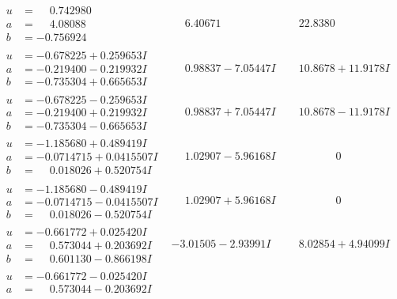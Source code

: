 \documentclass[1p]{elsarticle_modified}
\theoremstyle{definition}
\begin{document}
$$\begin{array}{c|c|c}
\begin{aligned}
u &= \phantom{-}0.742980\phantom{ +0.000000I} \\
a &= \phantom{-}4.08088\phantom{ +0.000000I} \\
b &= -0.756924\phantom{ +0.000000I}\end{aligned}
 & \phantom{-}6.40671\phantom{ +0.000000I} & \phantom{-}22.8380\phantom{ +0.000000I} \\ \hline\begin{aligned}
u &= -0.678225 + 0.259653 I \\
a &= -0.219400 - 0.219932 I \\
b &= -0.735304 + 0.665653 I\end{aligned}
 & \phantom{-}0.98837 - 7.05447 I & \phantom{-}10.8678 + 11.9178 I \\ \hline\begin{aligned}
u &= -0.678225 - 0.259653 I \\
a &= -0.219400 + 0.219932 I \\
b &= -0.735304 - 0.665653 I\end{aligned}
 & \phantom{-}0.98837 + 7.05447 I & \phantom{-}10.8678 - 11.9178 I \\ \hline\begin{aligned}
u &= -1.185680 + 0.489419 I \\
a &= -0.0714715 + 0.0415507 I \\
b &= \phantom{-}0.018026 + 0.520754 I\end{aligned}
 & \phantom{-}1.02907 - 5.96168 I & \phantom{-0.000000 } 0 \\ \hline\begin{aligned}
u &= -1.185680 - 0.489419 I \\
a &= -0.0714715 - 0.0415507 I \\
b &= \phantom{-}0.018026 - 0.520754 I\end{aligned}
 & \phantom{-}1.02907 + 5.96168 I & \phantom{-0.000000 } 0 \\ \hline\begin{aligned}
u &= -0.661772 + 0.025420 I \\
a &= \phantom{-}0.573044 + 0.203692 I \\
b &= \phantom{-}0.601130 - 0.866198 I\end{aligned}
 & -3.01505 - 2.93991 I & \phantom{-}8.02854 + 4.94099 I \\ \hline\begin{aligned}
u &= -0.661772 - 0.025420 I \\
a &= \phantom{-}0.573044 - 0.203692 I \\

\end{aligned}
\end{array}$$
\end{document}
